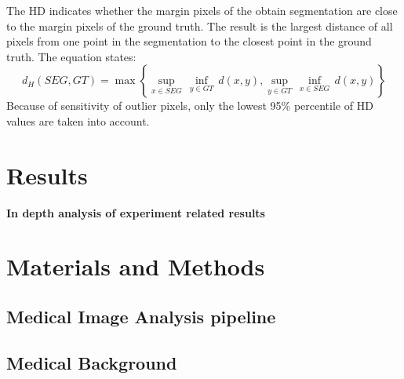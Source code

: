 \documentclass[journal]{IEEEtran}
\begin{document}
	The HD indicates whether the margin pixels of the obtain segmentation are close to the margin pixels of the ground truth. 
	The result is the largest distance of all pixels from one point in the segmentation to the closest point in the ground truth.
	The equation states:
	\begin{equation}
		d_H (SEG, GT) = \max \left\{ \underset{x\in SEG}{\mathop{\sup }}\,\underset{y\in GT}{\mathop{\inf }}\,d(x,y),\underset{y\in GT}{\mathop{\sup }}\,\underset{x\in SEG}{\mathop{\inf }}\,d(x,y) \right\}
	\end{equation}
	Because of sensitivity of outlier pixels, only the lowest 95\% percentile of HD values are taken into account.

	
	
	







\section{Results}
\textbf{In depth analysis of experiment related results}

\section{Materials and Methods}

\subsection{Medical Image Analysis pipeline}


\subsection{Medical Background}
\end{document}
